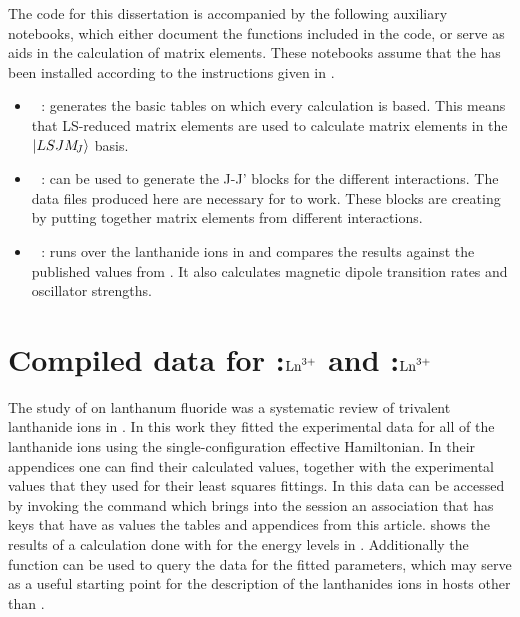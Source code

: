 \documentclass[11pt, twoside,openright]{article}
\begin{document}
The code for this dissertation is accompanied by the following auxiliary \mathematica notebooks, which either document the  functions included in the code, or serve as aids in the  calculation of matrix elements. These notebooks assume that the  has been installed according to the instructions given in .

\begin{itemize}
	\item \faFloppyO\,\, : generates the basic tables on which every calculation is based. This means that LS-reduced matrix elements are used to calculate matrix elements in the $|LSJM_{\!{J}}\rangle$ basis.
	\item \faFloppyO\,\, : can be used to generate the J-J' blocks for the different interactions. The data files produced here are necessary for  to work. These blocks are creating by putting together matrix elements from different interactions.
	\item \faFloppyO\,\, : runs \qlanth over the lanthanide ions in \LaFthree and compares the results against the published values from \bill. It also calculates magnetic dipole transition rates and oscillator strengths.
\end{itemize}

\section{Compiled data for \LaFthree:$\textrm{Ln}^{3+}$ and \liyorite:$\textrm{Ln}^{3+}$}\label{section:data}

The study of \bill on lanthanum fluoride was a systematic review of trivalent lanthanide ions in \LaFthree. In this work they fitted the experimental data for all of the lanthanide ions using the single-configuration effective Hamiltonian. In their appendices one can find their calculated values, together with the experimental values that they used for their least squares fittings. In \qlanth this data can be accessed by invoking the command  which brings into the session an association that has keys that have as values the tables and appendices from this article.  shows the results of a calculation done with \qlanth for the energy levels in \LaFthree. Additionally the function  can be used to query the data for the fitted parameters, which may serve as a useful starting point for the description of the lanthanides ions in hosts other than \LaFthree.
\end{document}
